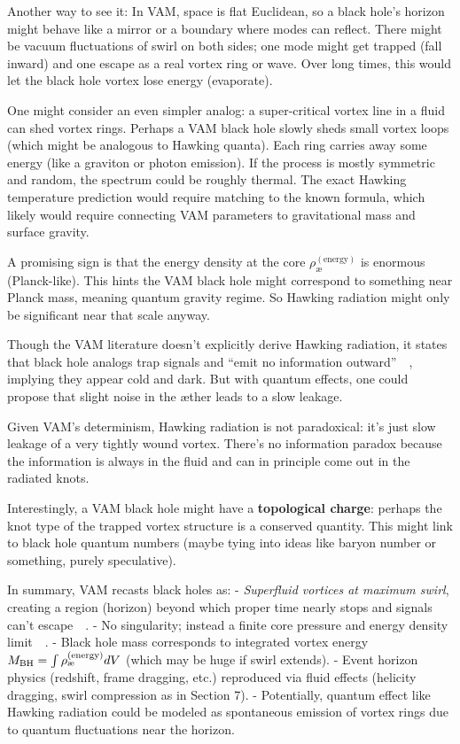 \documentclass[preprint]{revtex4-2}
\begin{document}
    Another way to see it: In VAM, space is flat Euclidean, so a black hole’s horizon might behave like a mirror or a boundary where modes can reflect. There might be vacuum fluctuations of swirl on both sides; one mode might get trapped (fall inward) and one escape as a real vortex ring or wave. Over long times, this would let the black hole vortex lose energy (evaporate).

    One might consider an even simpler analog: a super-critical vortex line in a fluid can shed vortex rings. Perhaps a VAM black hole slowly sheds small vortex loops (which might be analogous to Hawking quanta). Each ring carries away some energy (like a graviton or photon emission). If the process is mostly symmetric and random, the spectrum could be roughly thermal. The exact Hawking temperature prediction would require matching to the known formula, which likely would require connecting VAM parameters to gravitational mass and surface gravity.

    A promising sign is that the energy density at the core $\rho_{\text{\ae}}^{(\text{energy})}$ is enormous (Planck-like). This hints the VAM black hole might correspond to something near Planck mass, meaning quantum gravity regime. So Hawking radiation might only be significant near that scale anyway.

    Though the VAM literature doesn’t explicitly derive Hawking radiation, it states that black hole analogs trap signals and “emit no information outward”~\cite{reference_133}~\cite{reference_134}, implying they appear cold and dark. But with quantum effects, one could propose that slight noise in the æther leads to a slow leakage.

    Given VAM’s determinism, Hawking radiation is not paradoxical: it’s just slow leakage of a very tightly wound vortex. There’s no information paradox because the information is always in the fluid and can in principle come out in the radiated knots.

    Interestingly, a VAM black hole might have a \textbf{topological charge}: perhaps the knot type of the trapped vortex structure is a conserved quantity. This might link to black hole quantum numbers (maybe tying into ideas like baryon number or something, purely speculative).

    In summary, VAM recasts black holes as:
    - \emph{Superfluid vortices at maximum swirl}, creating a region (horizon) beyond which proper time nearly stops and signals can’t escape~\cite{reference_135}~\cite{reference_136}.
    - No singularity; instead a finite core pressure and energy density limit~\cite{reference_137}~\cite{reference_138}.
    - Black hole mass corresponds to integrated vortex energy $M_{\rm BH} = \int \rho_{\text{\ae}}^{(\text{energy})} dV$ (which may be huge if swirl extends).
    - Event horizon physics (redshift, frame dragging, etc.) reproduced via fluid effects (helicity dragging, swirl compression as in Section 7).
    - Potentially, quantum effect like Hawking radiation could be modeled as spontaneous emission of vortex rings due to quantum fluctuations near the horizon.
\end{document}
